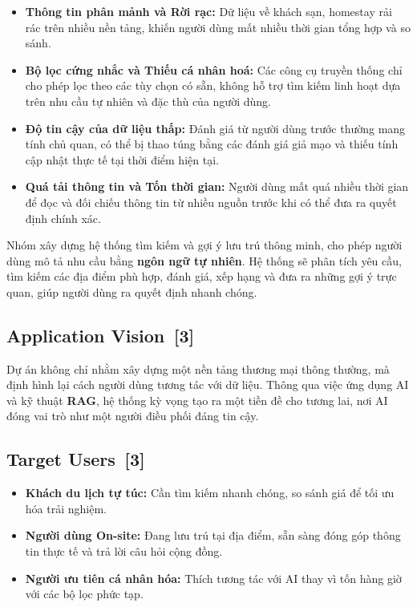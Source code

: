 \documentclass[12pt, a4paper]{article}
\begin{document}
\begin{itemize}[label=\textcolor{blue!70!black}{\faTimesCircle}]
  \item \textbf{Thông tin phân mảnh và Rời rạc:} Dữ liệu về khách sạn, homestay rải rác trên nhiều nền tảng, khiến người dùng mất nhiều thời gian tổng hợp và so sánh.
  \item \textbf{Bộ lọc cứng nhắc và Thiếu cá nhân hoá:} Các công cụ truyền thống chỉ cho phép lọc theo các tùy chọn có sẵn, không hỗ trợ tìm kiếm linh hoạt dựa trên nhu cầu tự nhiên và đặc thù của người dùng.
  \item \textbf{Độ tin cậy của dữ liệu thấp:} Đánh giá từ người dùng trước thường mang tính chủ quan, có thể bị thao túng bằng các đánh giá giả mạo và thiếu tính cập nhật thực tế tại thời điểm hiện tại.
  \item \textbf{Quá tải thông tin và Tốn thời gian:} Người dùng mất quá nhiều thời gian để đọc và đối chiếu thông tin từ nhiều nguồn trước khi có thể đưa ra quyết định chính xác.
\end{itemize}

\begin{infobox}
Nhóm xây dựng hệ thống tìm kiếm và gợi ý lưu trú thông minh, cho phép người dùng mô tả nhu cầu bằng \textbf{ngôn ngữ tự nhiên}. Hệ thống sẽ phân tích yêu cầu, tìm kiếm các địa điểm phù hợp, đánh giá, xếp hạng và đưa ra những gợi ý trực quan, giúp người dùng ra quyết định nhanh chóng.
\end{infobox}

\subsection[Application Vision]{Application Vision \,{\normalfont\small\textcolor{cyan!70!black}{[3]}}}
Dự án không chỉ nhằm xây dựng một nền tảng thương mại thông thường, mà định hình lại cách người dùng tương tác với dữ liệu. Thông qua việc ứng dụng AI và kỹ thuật \textbf{RAG}, hệ thống kỳ vọng tạo ra một tiền đề cho tương lai, nơi AI đóng vai trò như một người điều phối đáng tin cậy.

\subsection[Target Users]{Target Users \,{\normalfont\small\textcolor{cyan!70!black}{[3]}}}
\begin{itemize}[label=\textcolor{cyan!70!black}{\faUserCheck}]
  \item \textbf{Khách du lịch tự túc:} Cần tìm kiếm nhanh chóng, so sánh giá để tối ưu hóa trải nghiệm.
  \item \textbf{Người dùng On-site:} Đang lưu trú tại địa điểm, sẵn sàng đóng góp thông tin thực tế và trả lời câu hỏi cộng đồng.
  \item \textbf{Người ưu tiên cá nhân hóa:} Thích tương tác với AI thay vì tốn hàng giờ với các bộ lọc phức tạp.
\end{itemize}
\end{document}
